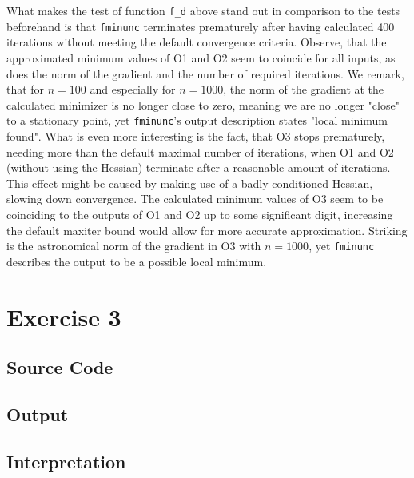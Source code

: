 \documentclass{article}
\begin{document}
        What makes the test of function \texttt{f\_d} above stand out in comparison to the tests beforehand is that \texttt{fminunc} terminates prematurely after having calculated 400 iterations without meeting the default convergence criteria. Observe, that the approximated minimum values of O1 and O2 seem to coincide for all inputs, as does the norm of the gradient and the number of required iterations. We remark, that for $n=100$  and especially for $n=1000$, the norm of the gradient at the calculated minimizer is no longer close to zero, meaning we are no longer "close" to a stationary point, yet \texttt{fminunc}'s output description states "local minimum found". What is even more interesting is the fact, that O3 stops prematurely, needing more than the default maximal number of iterations, when O1 and O2 (without using the Hessian) terminate after a reasonable amount of iterations. This effect might be caused by making use of a badly conditioned Hessian, slowing down convergence. The calculated minimum values of O3 seem to be coinciding to the outputs of O1 and O2 up to some significant digit, increasing the default maxiter bound would allow for more accurate approximation. Striking is the astronomical norm of the gradient in O3 with $n=1000$, yet \texttt{fminunc} describes the output to be a possible local minimum.

	
	\section{Exercise 3}
    \subsection{Source Code}
	

    \subsection{Output}
	
	
    \subsection{Interpretation}
\end{document}
